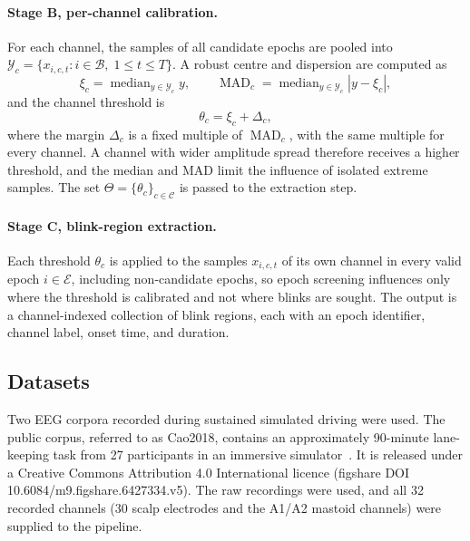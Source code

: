 \documentclass[journal,twoside,web]{ieeecolor}
\begin{document}
\paragraph{Stage B, per-channel calibration.}
For each channel, the samples of all candidate epochs are pooled into $\mathcal{Y}_c=\{x_{i,c,t}: i \in \mathcal{B},\; 1 \leq t \leq T\}$. A robust centre and dispersion are computed as
\begin{equation}
\xi_c = \operatorname{median}_{y \in \mathcal{Y}_c} y,\qquad
\operatorname{MAD}_c= \operatorname{median}_{y \in \mathcal{Y}_c}\left|y-\xi_c\right|,
\end{equation}
and the channel threshold is
\begin{equation}
\theta_c = \xi_c + \Delta_c ,
\end{equation}
where the margin $\Delta_c$ is a fixed multiple of $\operatorname{MAD}_c$, with the same multiple for every channel. A channel with wider amplitude spread therefore receives a higher threshold, and the median and MAD limit the influence of isolated extreme samples. The set $\Theta=\{\theta_c\}_{c\in\mathcal{C}}$ is passed to the extraction step.

\paragraph{Stage C, blink-region extraction.}
Each threshold $\theta_c$ is applied to the samples $x_{i,c,t}$ of its own channel in every valid epoch $i\in\mathcal{E}$, including non-candidate epochs, so epoch screening influences only where the threshold is calibrated and not where blinks are sought. The output is a channel-indexed collection of blink regions, each with an epoch identifier, channel label, onset time, and duration.

\subsection{Datasets}\label{sec:datasets}

Two EEG corpora recorded during sustained simulated driving were used. The public corpus, referred to as Cao2018, contains an approximately 90-minute lane-keeping task from 27 participants in an immersive simulator~\citep{cao2019multichannel}. It is released under a Creative Commons Attribution 4.0 International licence (figshare DOI 10.6084/m9.figshare.6427334.v5). The raw recordings were used, and all 32 recorded channels (30 scalp electrodes and the A1/A2 mastoid channels) were supplied to the pipeline.
\end{document}

